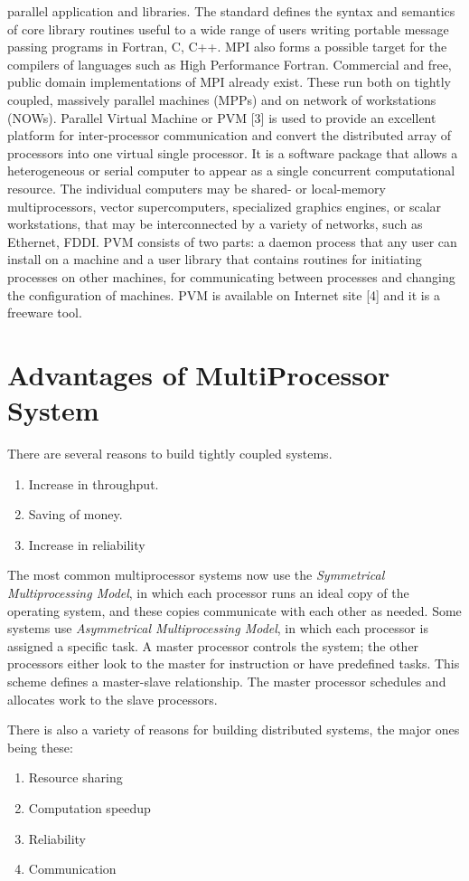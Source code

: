 parallel application and libraries. The standard defines the syntax and semantics of core library routines useful to a wide range of users writing portable
message passing programs in Fortran, C, C++. MPI also forms a possible target for the compilers of languages such as High Performance Fortran. Commercial and
free, public domain implementations of MPI already exist. These run both on tightly coupled, massively parallel machines (MPPs) and on network of workstations
(NOWs). Parallel Virtual Machine or PVM [3] is used to provide an excellent platform for inter-processor communication and convert the distributed array of
processors into one virtual single processor. It is a software package that allows a heterogeneous or serial computer to appear as a
single concurrent computational resource. The individual computers may be shared- or local-memory multiprocessors, vector supercomputers, specialized graphics
engines, or scalar workstations, that may be interconnected by a variety of networks, such as Ethernet, FDDI. PVM consists of two parts: a daemon process that
any user can install on a machine and a user library that contains routines for initiating processes on other machines, for communicating between processes
and changing the configuration of machines. PVM is available on Internet site [4] and it is a freeware tool. \par

\section{Advantages of MultiProcessor System}
There are several reasons to build tightly coupled systems.

\begin{enumerate}
\item Increase in throughput.
\item Saving of money.
\item Increase in reliability
\end{enumerate}
\hspace{1in} The most common multiprocessor systems now use the {\em Symmetrical Multiprocessing Model}, in which each processor runs an ideal copy  of the
operating system, and these copies communicate with each other as needed. Some systems use {\em Asymmetrical Multiprocessing Model}, in which each processor
is assigned a specific task. A master processor controls the system; the other processors either look to the master for instruction or have predefined tasks. 
This scheme defines a master-slave relationship. The master processor schedules and allocates work to the slave processors.\par
\hspace{1in} There is also a variety of reasons for building distributed systems, the major ones being these:
\begin{enumerate}
\item Resource sharing
\item Computation speedup
\item Reliability
\item Communication
\end{enumerate} 
 
